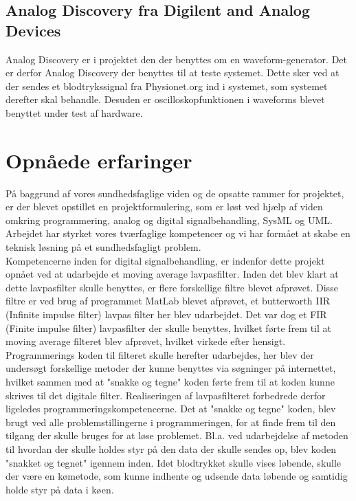 \subsection{Analog Discovery fra Digilent and Analog Devices}
Analog Discovery er i projektet den der benyttes om en waveform-generator. Det er derfor Analog Discovery der benyttes til at teste systemet. Dette sker ved at der sendes et blodtrykssignal fra Physionet.org ind i systemet, som systemet derefter skal behandle. Desuden er oscilloskopfunktionen i waveforms blevet benyttet under test af hardware.
\section{Opnåede erfaringer}
På baggrund af vores sundhedsfaglige viden og de opsatte rammer for projektet, er der blevet opstillet en projektformulering, som er løst ved hjælp af viden omkring programmering, analog og digital signalbehandling, SysML og UML. Arbejdet har styrket vores tværfaglige kompetencer og vi har formået at skabe en teknisk løsning på et sundhedsfagligt problem.\\
Kompetencerne inden for digital signalbehandling, er indenfor dette projekt opnået ved at udarbejde et moving average lavpasfilter. Inden det blev klart at dette lavpasfilter skulle benyttes, er flere forskellige filtre blevet afprøvet. Disse filtre er ved brug af programmet MatLab blevet afprøvet, et butterworth IIR (Infinite impulse filter) lavpas filter her blev udarbejdet. Det var dog et FIR (Finite impulse filter) lavpasfilter der skulle benyttes, hvilket førte frem til at moving average filteret blev afprøvet, hvilket virkede efter hensigt. \\
Programmerings koden til filteret skulle herefter udarbejdes, her blev der undersøgt forskellige metoder der kunne benyttes via søgninger på internettet, hvilket sammen med at "snakke og tegne" koden førte frem til at koden kunne skrives til det digitale filter. Realiseringen af lavpasfilteret forbedrede derfor ligeledes programmeringskompetencerne. Det at "snakke og tegne" koden, blev brugt ved alle problemstillingerne i programmeringen, for at finde frem til den tilgang der skulle bruges for at løse problemet. Bl.a. ved udarbejdelse af metoden til hvordan der skulle holdes styr på den data der skulle sendes op, blev koden "snakket og tegnet" igennem inden. Idet blodtrykket skulle vises løbende, skulle der være en kømetode, som kunne indhente og udsende data løbende og samtidig holde styr på data i køen.\\
